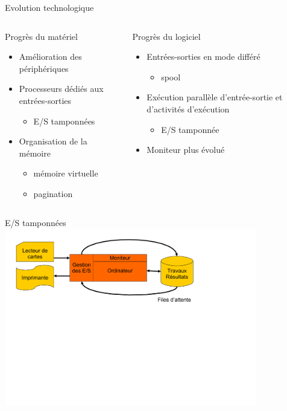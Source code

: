 \begin{frame}{Evolution technologique}
\begin{columns}
\begin{block}{Progrès du matériel}
\begin{itemize}
\item Amélioration des périphériques
\item Processeurs dédiés aux entrées-sorties
\begin{itemize}
\item E/S tamponnées
\end{itemize}
\item Organisation de la mémoire
\begin{itemize}
\item mémoire virtuelle
\item pagination
\end{itemize}
\end{itemize}
\end{block}
\begin{block}{Progrès du logiciel}
\begin{itemize}
\item Entrées-sorties en mode différé
\begin{itemize}
\item spool
\end{itemize}
\item Exécution parallèle d’entrée-sortie et d’activités d’exécution
\begin{itemize}
\item E/S tamponnée
\end{itemize}
\item Moniteur plus évolué
\end{itemize}
\end{block}
\end{columns}
\end{frame}

\begin{frame}{E/S tamponnées}
\includegraphics[width=11cm]{../illustration/es_tampon.pdf}
\end{frame}

